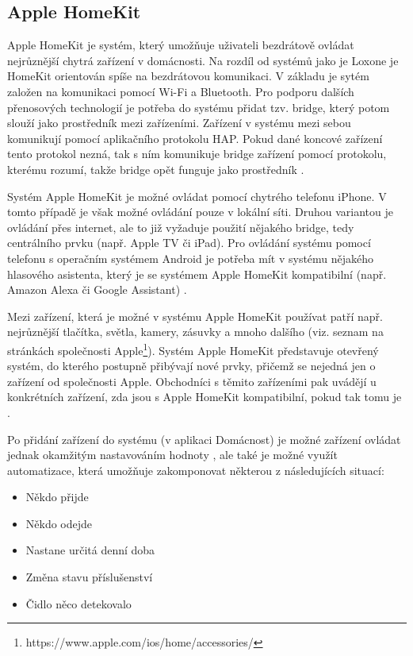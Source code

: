 \subsection*{Apple HomeKit}
Apple HomeKit je systém, který umožňuje uživateli bezdrátově ovládat nejrůznější chytrá zařízení v domácnosti. Na rozdíl od systémů jako je Loxone je HomeKit orientován spíše na bezdrátovou komunikaci. V základu je sytém založen na komunikaci pomocí Wi-Fi a Bluetooth. Pro podporu dalších přenosových technologií je potřeba do systému přidat tzv. bridge, který potom slouží jako prostředník mezi zařízeními. Zařízení v systému mezi sebou komunikují pomocí aplikačního protokolu HAP. Pokud dané koncové zařízení tento protokol nezná, tak s ním komunikuje bridge zařízení pomocí protokolu, kterému rozumí, takže bridge opět funguje jako prostředník \cite{HomeKitChytraDomacnost}.  

Systém Apple HomeKit je možné ovládat pomocí chytrého telefonu iPhone. V tomto případě je však možné ovládání pouze v lokální síti. Druhou variantou je ovládání přes internet, ale to již vyžaduje použití nějakého bridge, tedy centrálního prvku (např. Apple TV či iPad). 
Pro ovládání systému pomocí telefonu s operačním systémem Android je potřeba mít v systému nějakého hlasového asistenta, který je se systémem Apple HomeKit kompatibilní (např. Amazon Alexa či Google Assistant) \cite{JakZacitHomeKit}.

Mezi zařízení, která je možné v systému Apple HomeKit používat patří např. nejrůznější tlačítka, světla, kamery, zásuvky a mnoho dalšího (viz. seznam na stránkách společnosti Apple\footnote{https://www.apple.com/ios/home/accessories/}). Systém Apple HomeKit představuje otevřený systém, do kterého postupně přibývají nové prvky, přičemž se nejedná jen o zařízení od společnosti Apple. Obchodníci s těmito zařízeními pak uvádějí u konkrétních zařízení, zda jsou s Apple HomeKit kompatibilní, pokud tak tomu je \cite{HomeKitDokonalost}.

Po přidání zařízení do systému (v aplikaci Domácnost) je možné zařízení ovládat jednak okamžitým nastavováním hodnoty \cite{StavimeChytrouDomacnostApple2}, ale také je možné využít automatizace, která umožňuje zakomponovat některou z následujících situací:
\begin{itemize}
    \item Někdo přijde 
    \item Někdo odejde
    \item Nastane určitá denní doba
    \item Změna stavu příslušenství
    \item Čidlo něco detekovalo \cite{StavimeChytrouDomacnostApple3}
\end{itemize}

